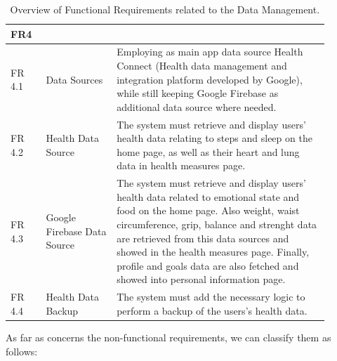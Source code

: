 \begin{table}[h!]
    \setstretch{\myspacing}
    \centering
    \begin{tabular}{|>{\raggedright\arraybackslash}p{0.1\linewidth}|>{\raggedright\arraybackslash}p{0.2\linewidth}|>{\raggedright\arraybackslash}p{0.6\linewidth}|}
        \hline
        \textbf{FR4} & \multicolumn{2}{>{\centering\arraybackslash}p{0.7\linewidth}|}{\textbf{Data Management}} \\
        \hline
        FR 4.1 & Data Sources & Employing as main app data source Health Connect (Health data management and integration platform developed by Google), while still keeping Google Firebase as additional data source where needed. \\
        \hline
        FR 4.2 & Health Data Source & The system must retrieve and display users' health data relating to steps and sleep on the home page, as well as their heart and lung data in health measures page. \\
        \hline
        FR 4.3 & Google Firebase Data Source & The system must retrieve and display users' health data related to emotional state and food on the home page. Also weight, waist circumference, grip, balance and strenght data are retrieved from this data sources and showed in the health measures page. Finally, profile and goals data are also fetched and showed into personal information page. \\
        \hline
        FR 4.4 & Health Data Backup & The system must add the necessary logic to perform a backup of the users's health data. \\
        \hline
    \end{tabular}
    \caption{Overview of Functional Requirements related to the Data Management.}
    \label{tab:fr4}
\end{table}

\clearpage

\noindent As far as concerns the non-functional requirements, we can classify them as follows:

